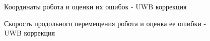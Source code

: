 \documentclass[14pt]{article}
\begin{document}
\begin{figure}
\noindent{}
\caption{Координаты робота и оценки их ошибок - UWB коррекция}
\label{fig:uwb_coordinates}
\end{figure}

\begin{figure}
\noindent{}
\caption{Скорость продольного перемещения робота и оценка ее ошибки - UWB коррекция}
\label{fig:uwb_velocities}
\end{figure}
\end{document}
